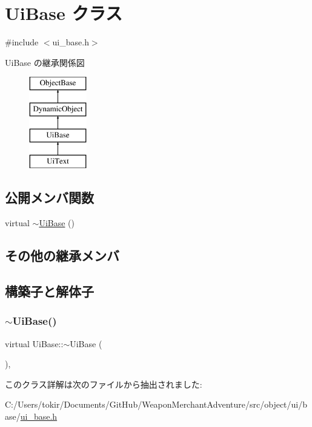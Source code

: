 \hypertarget{class_ui_base}{}\section{Ui\+Base クラス}
\label{class_ui_base}


{\ttfamily \#include $<$ui\+\_\+base.\+h$>$}

Ui\+Base の継承関係図\begin{figure}[H]
\begin{center}
\leavevmode
\includegraphics[height=4.000000cm]{class_ui_base}
\end{center}
\end{figure}
\subsection*{公開メンバ関数}
\begin{DoxyCompactItemize}
\item 
virtual \mbox{\hyperlink{class_ui_base_ac8713016ee88ba89e36897f3bbf72743}{$\sim$\+Ui\+Base}} ()
\end{DoxyCompactItemize}
\subsection*{その他の継承メンバ}


\subsection{構築子と解体子}
\mbox{\label{class_ui_base_ac8713016ee88ba89e36897f3bbf72743}} 
\subsubsection{\texorpdfstring{$\sim$\+Ui\+Base()}{~UiBase()}}
{\footnotesize\ttfamily virtual Ui\+Base\+::$\sim$\+Ui\+Base (\begin{DoxyParamCaption}{ }\end{DoxyParamCaption})\hspace{0.3cm}{\ttfamily [inline]}, {\ttfamily [virtual]}}



このクラス詳解は次のファイルから抽出されました\+:\begin{DoxyCompactItemize}
\item 
C\+:/\+Users/tokir/\+Documents/\+Git\+Hub/\+Weapon\+Merchant\+Adventure/src/object/ui/base/\mbox{\hyperlink{ui__base_8h}{ui\+\_\+base.\+h}}\end{DoxyCompactItemize}
